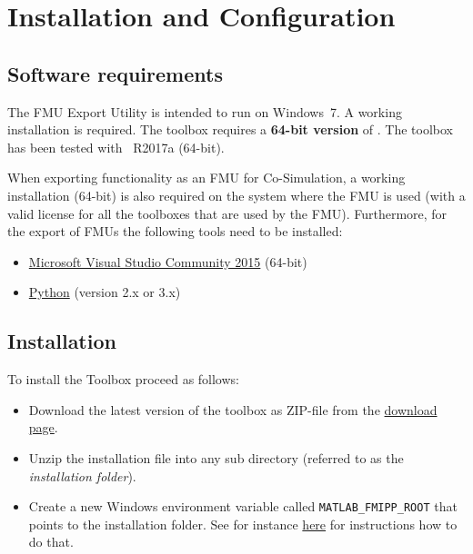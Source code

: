 \chapter{Installation and Configuration}

\section{Software requirements}

The \fmipp \matlab FMU Export Utility is intended to run on Windows~7.
A working \matlab installation is required.
The toolbox requires a \textbf{64-bit version} of \matlab.
The toolbox has been tested with \matlab~R2017a (64-bit).


When exporting \matlab functionality as an FMU for Co-Simulation, a working \matlab installation (64-bit) is also required on the system where the FMU is used (with a valid license for all the \matlab toolboxes that are used by the FMU).
Furthermore, for the export of FMUs the following tools need to be installed:
\begin{itemize}

  \item \href{https://visualstudio.microsoft.com/}{Microsoft Visual Studio Community 2015} (64-bit)

  \item \href{https://www.python.org/}{Python} (version 2.x or 3.x)
  
\end{itemize}


\section{Installation}
\label{sec:install}

To install the \fmipp \matlab Toolbox proceed as follows:
\begin{itemize}
  \item Download the latest version of the toolbox as ZIP-file from the \href{https://sourceforge.net/projects/matlab-fmu/files/latest/download}{download page}.
  
  \item Unzip the installation file into any sub directory (referred to as the \emph{installation folder}).
  
  \item Create a new Windows environment variable called \texttt{MATLAB\_FMIPP\_ROOT} that points to the installation folder.
  See for instance \href{http://www.computerhope.com/issues/ch000549.htm}{here} for instructions how to do that.
\end{itemize}


